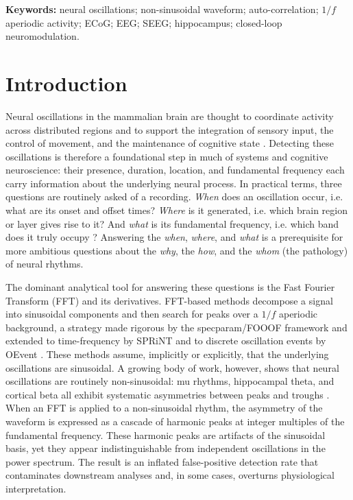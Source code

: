 \documentclass[11pt]{article}
\begin{document}
\noindent\textbf{Keywords:} neural oscillations; non-sinusoidal waveform; auto-correlation; $1/f$ aperiodic activity; ECoG; EEG; SEEG; hippocampus; closed-loop neuromodulation.

\section{Introduction}

Neural oscillations in the mammalian brain are thought to coordinate activity across distributed regions and to support the integration of sensory input, the control of movement, and the maintenance of cognitive state \citep{buzsaki2004neuronal,fries2015rhythms,giraud2012cortical,jensen2010shaping}. Detecting these oscillations is therefore a foundational step in much of systems and cognitive neuroscience: their presence, duration, location, and fundamental frequency each carry information about the underlying neural process. In practical terms, three questions are routinely asked of a recording. \emph{When} does an oscillation occur, i.e. what are its onset and offset times? \emph{Where} is it generated, i.e. which brain region or layer gives rise to it? And \emph{what} is its fundamental frequency, i.e. which band does it truly occupy \citep{buzsaki2004neuronal,pfurtscheller1999eventrelated}? Answering the \emph{when}, \emph{where}, and \emph{what} is a prerequisite for more ambitious questions about the \emph{why}, the \emph{how}, and the \emph{whom} (the pathology) of neural rhythms.

The dominant analytical tool for answering these questions is the Fast Fourier Transform (FFT) and its derivatives. FFT-based methods decompose a signal into sinusoidal components and then search for peaks over a $1/f$ aperiodic background, a strategy made rigorous by the specparam/FOOOF framework \citep{donoghue2020parameterizing} and extended to time-frequency by SPRiNT \citep{wilson2022sprint} and to discrete oscillation events by OEvent \citep{neymotin2022oevent}. These methods assume, implicitly or explicitly, that the underlying oscillations are sinusoidal. A growing body of work, however, shows that neural oscillations are routinely non-sinusoidal: mu rhythms, hippocampal theta, and cortical beta all exhibit systematic asymmetries between peaks and troughs \citep{belluscio2012crossfrequency,cole2017waveform,cole2019cycle,donoghue2022methodological}. When an FFT is applied to a non-sinusoidal rhythm, the asymmetry of the waveform is expressed as a cascade of harmonic peaks at integer multiples of the fundamental frequency. These harmonic peaks are artifacts of the sinusoidal basis, yet they appear indistinguishable from independent oscillations in the power spectrum. The result is an inflated false-positive detection rate that contaminates downstream analyses and, in some cases, overturns physiological interpretation.
\end{document}
